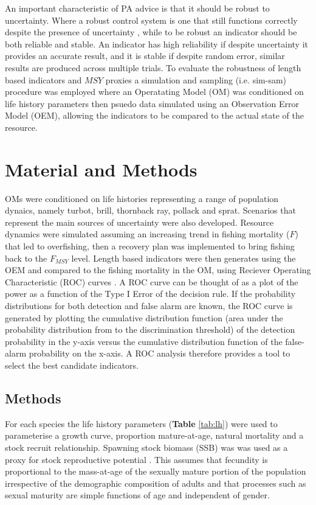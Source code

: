 \documentclass[12pt,doublespacing,a4paper]{ouparticle}
\begin{document}
An important characteristic of PA advice is that it should be robust to uncertainty. Where a robust control system is one that still functions correctly despite the presence of uncertainty \citep{radatz1990ieee, zhou1996robust}, while to be robust an indicator should be both reliable and stable. An indicator has high reliability if despite uncertainty it provides an accurate result, and it is stable if despite random error, similar results are produced across multiple trials. To evaluate the robustness of length based indicators and $MSY$ proxies  a simulation and sampling (i.e. sim-sam) procedure was employed where an Operatating Model (OM) was conditioned on life history parameters then psuedo data simulated using an Observation Error Model (OEM), allowing the indicators to be compared to the actual state of the resource.


\section{Material and Methods}

OMs were conditioned on life histories representing a range of population dynaics, namely turbot, brill, thornback ray, pollack and sprat. Scenarios that represent the main sources of uncertainty were also developed. Resource dynamics were simulated assuming an increasing trend in fishing mortality ($F$) that led to overfishing, then a recovery plan was implemented to bring fishing back to the $F_{MSY}$ level. Length based indicators were then generates using the OEM and compared to the fishing mortality in the OM, using Reciever Operating Characteristic (ROC) curves \citep{green1966signal}. A ROC curve can be thought of as a plot of the power as a function of the Type I Error of the decision rule. If the probability distributions for both detection and false alarm are known, the ROC curve is generated by plotting the cumulative distribution function (area under the probability distribution from  to the discrimination threshold) of the detection probability in the y-axis versus the cumulative distribution function of the false-alarm probability on the x-axis. A ROC analysis therefore provides a tool to select the best candidate indicators. 

\subsection{Methods}

For each species the life history parameters (\textbf{Table} \ref{tab:lh}) were used to parameterise a \cite{vonbert1957quantitative} growth curve, proportion mature-at-age, natural mortality \citep{lorenzen2002density} and a \cite{beverton1993dynamics} stock recruit relationship. Spawning stock biomass (SSB) was was used as a proxy for stock reproductive potential \citep[SRP][]{trippel_estimation_1999}. This assumes that fecundity is proportional to the mass-at-age of the sexually mature portion of the population irrespective of the demographic composition of adults \citep{murawski_impacts_2001} and that processes such as sexual maturity are simple functions of age \citep{matsuda_inconsistency_1996} and independent of gender.
\end{document}
